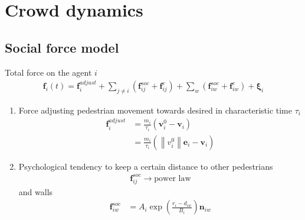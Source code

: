 \section{Crowd dynamics}
\subsection{Social force model}
Total force on the agent $ i $
\begin{align}
\mathbf{f}_{i}(t) = \mathbf{f}_{i}^{adjust} + \sum_{j\neq i}^{} \left(\mathbf{f}_{ij}^{soc} + \mathbf{f}_{ij}^{c}\right) + \sum_{w}^{} \left(\mathbf{f}_{iw}^{soc} + \mathbf{f}_{iw}^{c}\right) + \boldsymbol{\xi}_{i}
\end{align}

\begin{enumerate}[label=\roman{enumi})]
\item 
Force adjusting pedestrian movement towards desired in characteristic time $ \tau_{i} $
\begin{align}
\mathbf{f}_{i}^{adjust} &= \frac{m_{i}}{\tau_{i}} (\mathbf{v}_{i}^{0} - \mathbf{v}_{i}) \\
&=  \frac{m_{i}}{\tau_{i}} (\left\|v_{i}^{0}\right\| \mathbf{e}_{i} - \mathbf{v}_{i})
\end{align}


\item 
Psychological tendency to keep a certain distance to other pedestrians
\begin{align}
\mathbf{f}_{ij}^{soc} \to \text{power law}
\end{align}
and walls
\begin{align}
\mathbf{f}_{iw}^{soc} &= A_{i} \exp\left(\frac{r_{i} - d_{iw}}{B_{i}}\right) \mathbf{n}_{iw}
\end{align} 



\end{enumerate}
